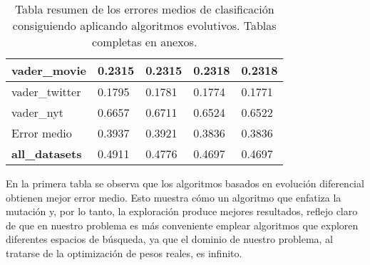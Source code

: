 \begin{table} [H]
{\begin{tabular}{|l|llll|}
		vader\_movie &0.2315 & 0.2315 & 0.2318 & 0.2318\\ \hline
		vader\_twitter & 0.1795 & 0.1781 & 0.1774 & 0.1771\\ \hline
		vader\_nyt & 0.6657& 0.6711 & 0.6524 & 0.6522\\ \hline
		Error medio & 0.3937 & 0.3921 & 0.3836 & 0.3836 \\ \hline 
		\textbf{all\_datasets} &0.4911&0.4776&0.4697&0.4697\\ \hline
	\end{tabular} 
}
\caption{Tabla resumen de los errores medios de clasificación consiguiendo aplicando algoritmos evolutivos. Tablas completas en anexos.}
\label{table:evolutivos}
\end{table}

En la primera tabla se observa que los algoritmos basados en evolución diferencial obtienen mejor error medio. Esto muestra cómo un algoritmo que enfatiza la mutación y, por lo tanto, la exploración produce mejores resultados, reflejo claro de que en nuestro problema es más conveniente emplear algoritmos que exploren diferentes espacios de búsqueda, ya que el dominio de nuestro problema, al tratarse de la optimización de pesos reales, es infinito.

